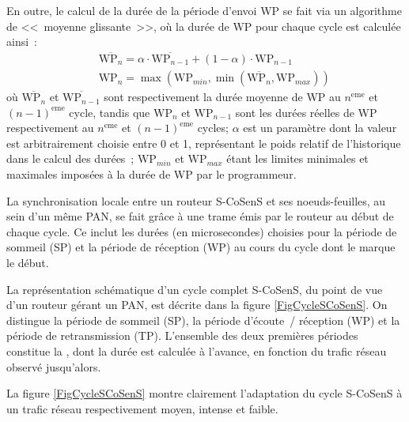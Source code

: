 En outre, le calcul de la durée de la période d'envoi WP se fait via un
algorithme de <<~moyenne glissante~>>, où la durée de WP pour chaque cycle
est calculée ainsi~:
\begin{eqnarray*}
&&
\overline{\mathrm{WP}_{n}} = \alpha \cdot \overline{\mathrm{WP}_{n-1}}
                + (1 - \alpha) \cdot \mathrm{WP}_{n-1}
\\ &&
\mathrm{WP}_{n} = \max ( \mathrm{WP}_{min},
                  \min ( \overline{\mathrm{WP}_{n}}, \mathrm{WP}_{max} ) )
\end{eqnarray*}
où $\overline{\mathrm{WP}_{n}}$ et $\overline{\mathrm{WP}_{n-1}}$
sont respectivement la durée moyenne de WP au $n^{\mathrm{eme}}$ et
$(n-1)^{\mathrm{eme}}$ cycle, tandis que $\mathrm{WP}_{n}$ et
$\mathrm{WP}_{n-1}$ sont les durées réelles de WP respectivement
au $n^{\mathrm{eme}}$ et $(n-1)^{\mathrm{eme}}$ cycles;
$\alpha$ est un paramètre dont la valeur est arbitrairement choisie
entre 0 et 1, représentant le poids relatif de l'historique dans le
calcul des durées~; $\mathrm{WP}_{min}$ et $\mathrm{WP}_{max}$ étant
les limites minimales et maximales imposées à la durée de WP par
le programmeur.

La synchronisation locale entre un routeur S-CoSenS et ses noeuds-feuilles,
au sein d'un même PAN, se fait grâce à une trame 
émis par le routeur au début de chaque cycle. Ce  inclut
les durées (en microsecondes) choisies pour la période de sommeil (SP) et
la période de réception (WP) au cours du cycle dont le 
marque le début.

La représentation schématique d'un cycle complet S-CoSenS,
du point de vue d'un routeur gérant un PAN, est décrite dans la figure
\vref{FigCycleSCoSenS}. On distingue la période de sommeil (SP),
la période d'écoute~/ réception (WP) et la période de retransmission (TP).
L'ensemble des deux premières périodes constitue la ,
dont la durée est calculée à l'avance, en fonction du trafic
réseau observé jusqu'alors.

La figure \vref{FigCycleSCoSenS} montre clairement l'adaptation du cycle
S-CoSenS à un trafic réseau respectivement moyen, intense et faible.


